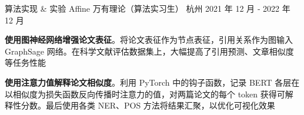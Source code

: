 \begin{cventries}
  \cventry
    {算法实现 \& 实验} %
    {Affine 万有理论（算法实习生）} %
    {杭州} %
    { 2021 年 12 月 ‑ 2022 年 12 月} %
    {
      \begin{cvitems} %
        \item {\textbf{使用图神经网络增强论文表征}。将论文表征作为节点表征，引用关系作为图输入 GraphSage 网络。在科学文献评估数据集上，大幅提高了引用预测、文章相似度等任务性能}
        \item {\textbf{使用注意力值解释论文相似度}。利用 PyTorch 中的钩子函数，记录 BERT 各层在以相似度为损失函数反向传播时注意力的值，对两篇论文的每个 token 获得可解释性分数。最后使用各类 NER、POS 方法将结果汇聚，以优化可视化效果}
      \end{cvitems}
    }



\end{cventries}
